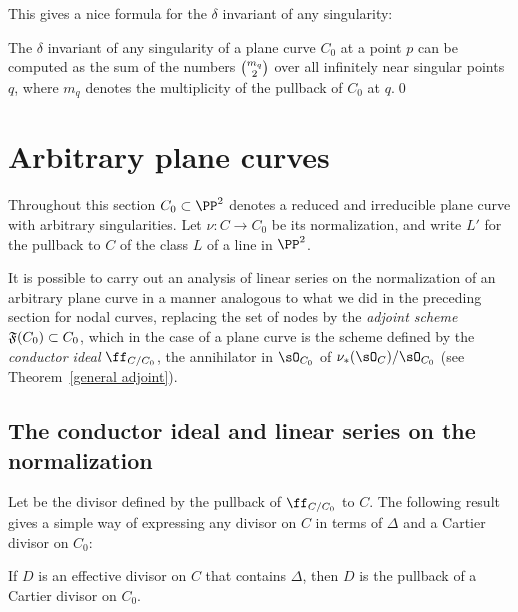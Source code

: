 This gives a nice formula for the $\delta$ invariant of any singularity:

\begin{corollary}
\label{computing delta}
The $\delta$ invariant of any singularity of a plane curve $C_{0}$ at
a point $p$ can be computed as the sum of the numbers $\tbinom{m_{q}}{2}$
over all infinitely near singular points $q$,
%
where
$m_{q}$
denotes the multiplicity of the pullback of $C_{0}$ at $q$.\qed
\end{corollary}

\section{Arbitrary plane curves} \label{arbitrary plane curves}

Throughout this section $C_0 \subset \PP^2$ denotes a reduced and
irreducible plane curve with arbitrary singularities. Let $\nu : C
\to C_0$ be its normalization, and write $L'$ for the pullback to $C$
of the class $L$ of a line in $\PP^{2}$.

It is possible to carry out an analysis of linear series on the
normalization of an arbitrary plane curve in a manner  analogous to
%
what we did in the preceding section for nodal curves, replacing 
the set of nodes by the 
\emph{adjoint scheme}
%
$\adj(C_{0})\subset C_{0}$, which in the case of a plane curve is the scheme
%
%
defined by the \emph{conductor ideal} $\ff_{C/C_0}$, the annihilator
in $\sO_{C_{0}}$ of $\nu_{*}(\sO_{C})/\sO_{C_{0}}$
(see Theorem~\ref{general adjoint}). 

\subsection*{The conductor ideal and linear series on the normalization}

Let 
 be the
divisor
defined by the pullback of $\ff_{C/C_0}$ to $C$.
The following result gives a simple way of expressing any divisor on $C$
in terms of $\Delta$ and a
Cartier divisor on $C_{0}$:

\begin{theorem}\label{Cartier on C}
If $D$ is an effective divisor on $C$ that contains $\Delta$,
then $D$ is the pullback of a Cartier divisor on $C_{0}$.
\unif
\end{theorem}

